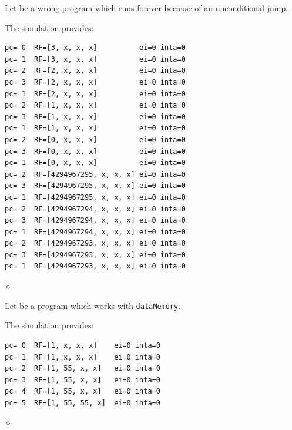 \begin{exemplu}
Let be a wrong program which runs forever because of an unconditional jump.
{\em 
{}
}

The simulation provides:
{\small
\begin{verbatim}
pc= 0  RF=[3, x, x, x]          ei=0 inta=0
pc= 1  RF=[3, x, x, x]          ei=0 inta=0
pc= 2  RF=[2, x, x, x]          ei=0 inta=0
pc= 3  RF=[2, x, x, x]          ei=0 inta=0
pc= 1  RF=[2, x, x, x]          ei=0 inta=0
pc= 2  RF=[1, x, x, x]          ei=0 inta=0
pc= 3  RF=[1, x, x, x]          ei=0 inta=0
pc= 1  RF=[1, x, x, x]          ei=0 inta=0
pc= 2  RF=[0, x, x, x]          ei=0 inta=0
pc= 3  RF=[0, x, x, x]          ei=0 inta=0
pc= 1  RF=[0, x, x, x]          ei=0 inta=0
pc= 2  RF=[4294967295, x, x, x] ei=0 inta=0
pc= 3  RF=[4294967295, x, x, x] ei=0 inta=0
pc= 1  RF=[4294967295, x, x, x] ei=0 inta=0
pc= 2  RF=[4294967294, x, x, x] ei=0 inta=0
pc= 3  RF=[4294967294, x, x, x] ei=0 inta=0
pc= 1  RF=[4294967294, x, x, x] ei=0 inta=0
pc= 2  RF=[4294967293, x, x, x] ei=0 inta=0
pc= 3  RF=[4294967293, x, x, x] ei=0 inta=0
pc= 1  RF=[4294967293, x, x, x] ei=0 inta=0
\end{verbatim}
}

$\diamond$
\end{exemplu}


\begin{exemplu}
Let be a  program which works with {\tt dataMemory}.
{\em 
{}
}

The simulation provides:
{\small
\begin{verbatim}
pc= 0  RF=[1, x, x, x]    ei=0 inta=0
pc= 1  RF=[1, x, x, x]    ei=0 inta=0
pc= 2  RF=[1, 55, x, x]   ei=0 inta=0
pc= 3  RF=[1, 55, x, x]   ei=0 inta=0
pc= 4  RF=[1, 55, x, x]   ei=0 inta=0
pc= 5  RF=[1, 55, 55, x]  ei=0 inta=0
\end{verbatim}
}

$\diamond$
\end{exemplu}





